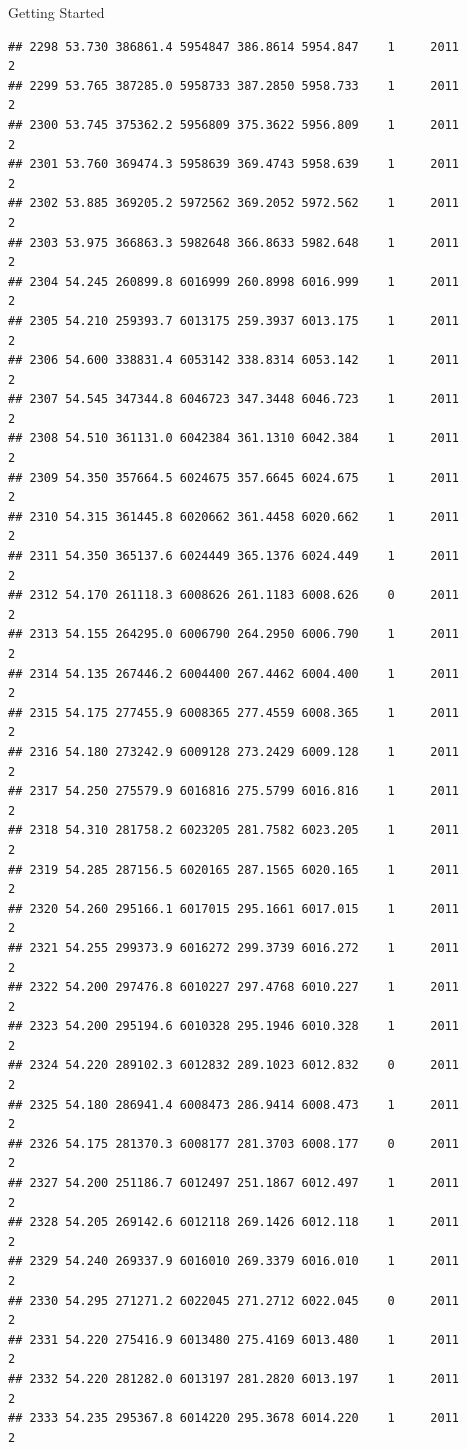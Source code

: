 \documentclass[
  ignorenonframetext,
]{beamer}
\begin{document}
\begin{frame}[fragile]{Getting Started}
\begin{verbatim}
## 2298 53.730 386861.4 5954847 386.8614 5954.847    1     2011        2
## 2299 53.765 387285.0 5958733 387.2850 5958.733    1     2011        2
## 2300 53.745 375362.2 5956809 375.3622 5956.809    1     2011        2
## 2301 53.760 369474.3 5958639 369.4743 5958.639    1     2011        2
## 2302 53.885 369205.2 5972562 369.2052 5972.562    1     2011        2
## 2303 53.975 366863.3 5982648 366.8633 5982.648    1     2011        2
## 2304 54.245 260899.8 6016999 260.8998 6016.999    1     2011        2
## 2305 54.210 259393.7 6013175 259.3937 6013.175    1     2011        2
## 2306 54.600 338831.4 6053142 338.8314 6053.142    1     2011        2
## 2307 54.545 347344.8 6046723 347.3448 6046.723    1     2011        2
## 2308 54.510 361131.0 6042384 361.1310 6042.384    1     2011        2
## 2309 54.350 357664.5 6024675 357.6645 6024.675    1     2011        2
## 2310 54.315 361445.8 6020662 361.4458 6020.662    1     2011        2
## 2311 54.350 365137.6 6024449 365.1376 6024.449    1     2011        2
## 2312 54.170 261118.3 6008626 261.1183 6008.626    0     2011        2
## 2313 54.155 264295.0 6006790 264.2950 6006.790    1     2011        2
## 2314 54.135 267446.2 6004400 267.4462 6004.400    1     2011        2
## 2315 54.175 277455.9 6008365 277.4559 6008.365    1     2011        2
## 2316 54.180 273242.9 6009128 273.2429 6009.128    1     2011        2
## 2317 54.250 275579.9 6016816 275.5799 6016.816    1     2011        2
## 2318 54.310 281758.2 6023205 281.7582 6023.205    1     2011        2
## 2319 54.285 287156.5 6020165 287.1565 6020.165    1     2011        2
## 2320 54.260 295166.1 6017015 295.1661 6017.015    1     2011        2
## 2321 54.255 299373.9 6016272 299.3739 6016.272    1     2011        2
## 2322 54.200 297476.8 6010227 297.4768 6010.227    1     2011        2
## 2323 54.200 295194.6 6010328 295.1946 6010.328    1     2011        2
## 2324 54.220 289102.3 6012832 289.1023 6012.832    0     2011        2
## 2325 54.180 286941.4 6008473 286.9414 6008.473    1     2011        2
## 2326 54.175 281370.3 6008177 281.3703 6008.177    0     2011        2
## 2327 54.200 251186.7 6012497 251.1867 6012.497    1     2011        2
## 2328 54.205 269142.6 6012118 269.1426 6012.118    1     2011        2
## 2329 54.240 269337.9 6016010 269.3379 6016.010    1     2011        2
## 2330 54.295 271271.2 6022045 271.2712 6022.045    0     2011        2
## 2331 54.220 275416.9 6013480 275.4169 6013.480    1     2011        2
## 2332 54.220 281282.0 6013197 281.2820 6013.197    1     2011        2
## 2333 54.235 295367.8 6014220 295.3678 6014.220    1     2011        2

\end{verbatim}
\end{frame}
\end{document}

